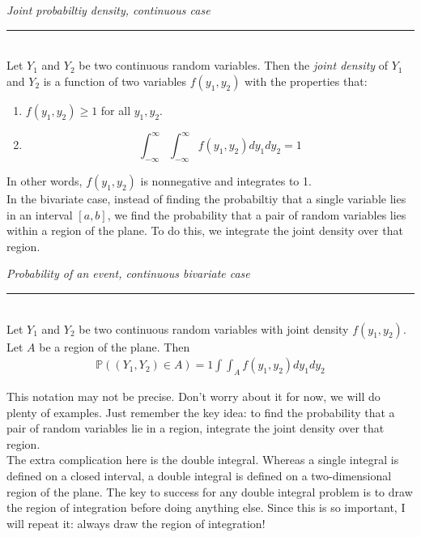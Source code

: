 \documentclass[12pt]{article}
\theoremstyle{definition}
\theoremstyle{remark}
\def\P{{\mathbb P}}
\begin{document}
\begin{framed}
\emph{Joint probabiltiy density, continuous case}\\
  \rule{\dimexpr{}\fboxrule}{.1pt} \\
Let $Y_1$ and $Y_2$ be two continuous random variables. Then the \emph{joint density} of $Y_1$ and $Y_2$ is a function of two variables $f(y_1, y_2)$ with the properties that:
\begin{enumerate}
\item $f(y_1, y_2) \geq 1$ for all $y_1, y_2$.
\item \[
\int_{-\infty}^\infty \int_{-\infty}^\infty f(y_1, y_2) dy_1 dy_2 = 1
\]
\end{enumerate}
\end{framed}
In other words, $f(y_1, y_2)$ is nonnegative and integrates to 1.\\

In the bivariate case, instead of finding the probabiltiy that a single variable lies in an interval $[a, b]$, we find the probability that a pair of random variables lies within a region of the plane. To do this, we integrate the joint density over that region.

\begin{framed}
\emph{Probability of an event, continuous bivariate case}\\
  \rule{\dimexpr{}\fboxrule}{.1pt} \\
Let $Y_1$ and $Y_2$ be two continuous random variables with joint density $f(y_1, y_2)$. Let $A$ be a region of the plane. Then
\begin{align*}
\P((Y_1, Y_2) \in A) = 1 \int \int_A f(y_1, y_2) dy_1 dy_2
\end{align*}
\end{framed}
This notation may not be precise. Don't worry about it for now, we will do plenty of examples. Just remember the key idea: to find the probability that a pair of random variables lie in a region, integrate the joint density over that region.\\

The extra complication here is the double integral. Whereas a single integral is defined on a closed interval, a double integral is defined on a two-dimensional region of the plane. The key to success for any double integral problem is to draw the region of integration before doing anything else. Since this is so important, I will repeat it: always draw the region of integration!\\
\end{document}
